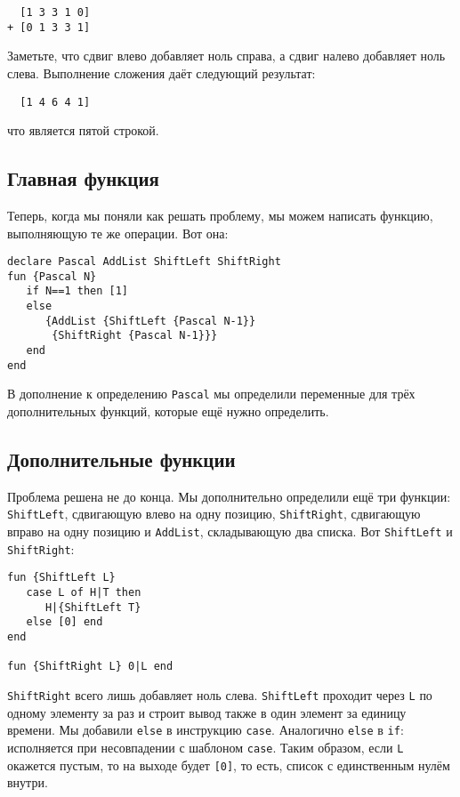 \begin{lstlisting}
  [1 3 3 1 0]
+ [0 1 3 3 1]
\end{lstlisting}

Заметьте, что сдвиг влево добавляет ноль справа, а сдвиг налево добавляет ноль слева. Выполнение сложения даёт следующий результат:

\begin{lstlisting}
  [1 4 6 4 1]
\end{lstlisting}

что является пятой строкой.

\subsection{Главная функция}\label{subsection:The_main_function}

Теперь, когда мы поняли как решать проблему, мы можем написать функцию, выполняющую те же операции. Вот она:

\begin{lstlisting}
declare Pascal AddList ShiftLeft ShiftRight
fun {Pascal N}
   if N==1 then [1]
   else
      {AddList {ShiftLeft {Pascal N-1}}
       {ShiftRight {Pascal N-1}}}
   end
end
\end{lstlisting}

В дополнение к определению \lstinline|Pascal| мы определили переменные для трёх дополнительных функций, которые ещё нужно определить.

\subsection{Дополнительные функции}\label{subsection:The_auxiliary_functions}

Проблема решена не до конца. Мы дополнительно определили ещё три функции: \lstinline|ShiftLeft|, сдвигающую влево на одну позицию, \lstinline|ShiftRight|, сдвигающую вправо на одну позицию и \lstinline|AddList|, складывающую два списка. Вот \lstinline|ShiftLeft| и \lstinline|ShiftRight|:

\begin{lstlisting}
fun {ShiftLeft L}
   case L of H|T then
      H|{ShiftLeft T}
   else [0] end
end

fun {ShiftRight L} 0|L end
\end{lstlisting}

\lstinline|ShiftRight| всего лишь добавляет ноль слева. \lstinline|ShiftLeft| проходит через \lstinline|L| по одному элементу за раз и строит вывод также в один элемент за единицу времени. Мы добавили \lstinline|else| в инструкцию \lstinline|case|. Аналогично \lstinline|else| в \lstinline|if|: исполняется при несовпадении с шаблоном \lstinline|case|. Таким образом, если \lstinline|L| окажется пустым, то на выходе будет \lstinline|[0]|, то есть, список с единственным нулём внутри.

